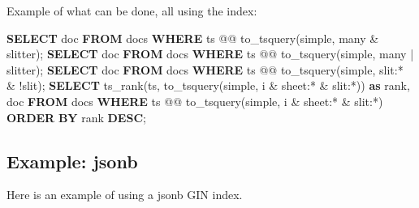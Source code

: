\documentclass[
]{article}
\newenvironment{Shaded}{}{}
\newcommand{\FunctionTok}[1]{\textcolor[rgb]{0.02,0.16,0.49}{#1}}
\newcommand{\KeywordTok}[1]{\textcolor[rgb]{0.00,0.44,0.13}{\textbf{#1}}}
\newcommand{\NormalTok}[1]{#1}
\newcommand{\StringTok}[1]{\textcolor[rgb]{0.25,0.44,0.63}{#1}}
\begin{document}
Example of what can be done, all using the index:

\begin{Shaded}
\begin{Highlighting}[]
\KeywordTok{SELECT}\NormalTok{ doc }\KeywordTok{FROM}\NormalTok{ docs }\KeywordTok{WHERE}\NormalTok{ ts @@ to\_tsquery(}\StringTok{\textquotesingle{}simple\textquotesingle{}}\NormalTok{, }\StringTok{\textquotesingle{}many \& slitter\textquotesingle{}}\NormalTok{);}
\KeywordTok{SELECT}\NormalTok{ doc }\KeywordTok{FROM}\NormalTok{ docs }\KeywordTok{WHERE}\NormalTok{ ts @@ to\_tsquery(}\StringTok{\textquotesingle{}simple\textquotesingle{}}\NormalTok{, }\StringTok{\textquotesingle{}many | slitter\textquotesingle{}}\NormalTok{);}
\KeywordTok{SELECT}\NormalTok{ doc }\KeywordTok{FROM}\NormalTok{ docs }\KeywordTok{WHERE}\NormalTok{ ts @@ to\_tsquery(}\StringTok{\textquotesingle{}simple\textquotesingle{}}\NormalTok{, }\StringTok{\textquotesingle{}slit:* \& !slit\textquotesingle{}}\NormalTok{);}
\KeywordTok{SELECT}\NormalTok{ ts\_rank(ts, to\_tsquery(}\StringTok{\textquotesingle{}simple\textquotesingle{}}\NormalTok{, }\StringTok{\textquotesingle{}i \& sheet:* \& slit:*\textquotesingle{}}\NormalTok{)) }\KeywordTok{as} \FunctionTok{rank}\NormalTok{, doc}
    \KeywordTok{FROM}\NormalTok{ docs}
    \KeywordTok{WHERE}\NormalTok{ ts @@ to\_tsquery(}\StringTok{\textquotesingle{}simple\textquotesingle{}}\NormalTok{, }\StringTok{\textquotesingle{}i \& sheet:* \& slit:*\textquotesingle{}}\NormalTok{)}
    \KeywordTok{ORDER} \KeywordTok{BY} \FunctionTok{rank} \KeywordTok{DESC}\NormalTok{;}
\end{Highlighting}
\end{Shaded}

\hypertarget{example-jsonb}{%
\subsection{Example: jsonb}\label{example-jsonb}}

Here is an example of using a jsonb GIN index.
\end{document}
